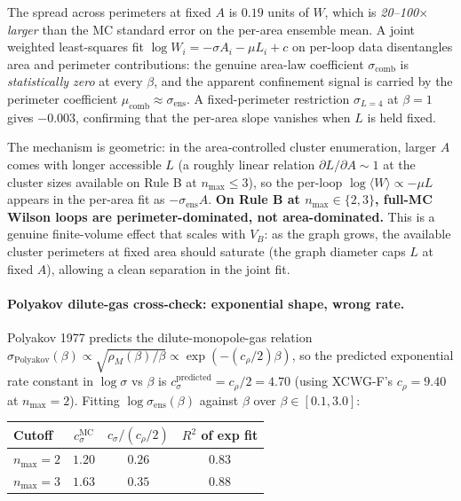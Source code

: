 \documentclass[11pt]{article}
\begin{document}
The spread across perimeters at fixed $A$ is $0.19$ units of $W$, which is
\emph{20--100$\times$ larger} than the MC standard error on the
per-area ensemble mean. A joint weighted least-squares fit
$\log W_i=-\sigma A_i-\mu L_i+c$ on per-loop data disentangles area and
perimeter contributions: the genuine area-law coefficient $\sigma_\text{comb}$
is \emph{statistically zero} at every $\beta$, and the apparent confinement
signal is carried by the perimeter coefficient
$\mu_\text{comb}\approx\sigma_\text{ens}$. A fixed-perimeter restriction
$\sigma_{L=4}$ at $\beta=1$ gives $-0.003$, confirming that the per-area
slope vanishes when $L$ is held fixed.

The mechanism is geometric: in the area-controlled cluster enumeration, larger
$A$ comes with longer accessible $L$ (a roughly linear relation
$\partial L/\partial A\sim 1$ at the cluster sizes available on Rule B at
$n_\text{max}\le 3$), so the per-loop $\log\langle W\rangle\propto -\mu L$
appears in the per-area fit as $-\sigma_\text{ens}A$. \textbf{On Rule B at
$n_\text{max}\in\{2,3\}$, full-MC Wilson loops are perimeter-dominated, not
area-dominated.} This is a genuine finite-volume effect that scales with
$V_B$: as the graph grows, the available cluster perimeters at fixed area
should saturate (the graph diameter caps $L$ at fixed $A$), allowing a clean
separation in the joint fit.

\paragraph{Polyakov dilute-gas cross-check: exponential shape, wrong rate.}
Polyakov 1977 predicts the dilute-monopole-gas relation
$\sigma_\text{Polyakov}(\beta)\propto\sqrt{\rho_M(\beta)/\beta}\propto
\exp(-(c_\rho/2)\beta)$, so the predicted exponential rate constant in
$\log\sigma$ vs $\beta$ is $c_\sigma^\text{predicted}=c_\rho/2=4.70$
(using XCWG-F's $c_\rho=9.40$ at $n_\text{max}=2$). Fitting
$\log\sigma_\text{ens}(\beta)$ against $\beta$ over $\beta\in[0.1,3.0]$:

\begin{center}
\begin{tabular}{lccc}
\toprule
Cutoff & $c_\sigma^\text{MC}$ & $c_\sigma/(c_\rho/2)$ & $R^2$ of exp fit \\
\midrule
$n_\text{max}=2$ & $1.20$ & $0.26$ & $0.83$ \\
$n_\text{max}=3$ & $1.63$ & $0.35$ & $0.88$ \\
\bottomrule
\end{tabular}
\end{center}
\end{document}
